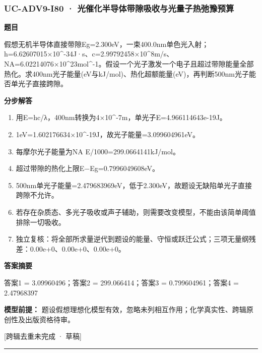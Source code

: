 \documentclass[UTF8,11pt,a4paper]{ctexart}
\begin{document}
\subsubsection*{UC-ADV9-I80 · 光催化半导体带隙吸收与光量子热弛豫预算}
\noindent\textbf{题目}\par
假想无机半导体直接带隙Eg=2.300eV，一束400.0nm单色光入射；h=6.62607015×10\textasciicircum{}-34J·s、c=2.99792458×10\textasciicircum{}8m/s、NA=6.02214076×10\textasciicircum{}23mol\textasciicircum{}-1。假设一个光子激发一个电子且超过带隙能量全部热化。求400nm光子能量(eV与kJ/mol)、热化超额能量(eV)，再判断500nm光子能否单光子直接跨隙。\par
\medskip\noindent\textbf{分步解答}
\begin{enumerate}
\item 用E=hc/λ，400nm转换为4×10\textasciicircum{}-7m，单光子E=4.966114643e-19J。
\item 1eV=1.602176634×10\textasciicircum{}-19J，故光子能量=3.099604961eV。
\item 每摩尔光子能量为NA E/1000=299.0664141kJ/mol。
\item 超过带隙的热化上限E−Eg=0.7996049608eV。
\item 500nm单光子能量=2.479683969eV，低于2.300eV，故题设无缺陷单光子直接跨隙不允许。
\item 若存在杂质态、多光子吸收或声子辅助，则需要改变模型，不能由该简单阈值排除一切吸收。
\item 独立复核：将全部所求量逆代到题设的能量、守恒或跃迁公式；三项无量纲残差：0.00e+0、0.00e+0、0.00e+0。
\end{enumerate}
\noindent\textbf{答案摘要}\par
答案1 = 3.09960496；答案2 = 299.066414；答案3 = 0.799604961；答案4 = 2.47968397\par
\noindent\textbf{模型前提：}
题设假想理想化模型有效，忽略未列相互作用；化学真实性、跨辑原创性及出版资格待审。\par
\noindent\textcolor{red!65!black}{[跨辑去重未完成 · 草稿]} \par
\medskip\hrule\medskip
{}
\end{document}
